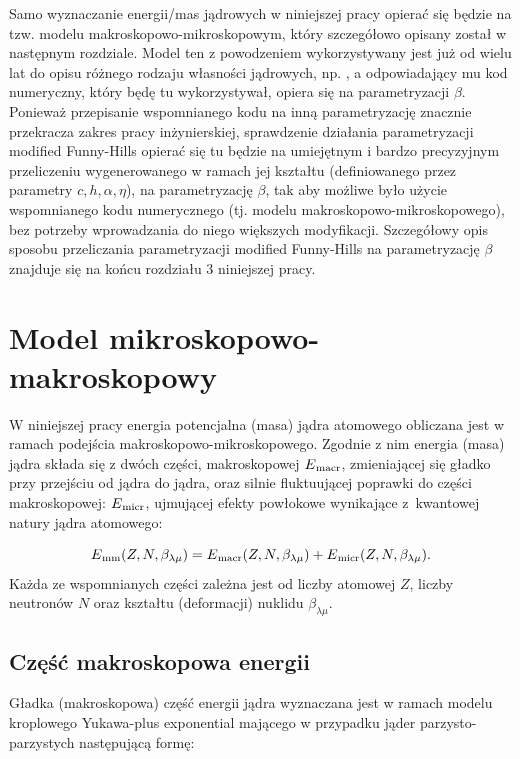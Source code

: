 \documentclass[a4paper,polish]{article}
\numberwithin{equation}{section}
\begin{document}
Samo wyznaczanie energii/mas jądrowych w niniejszej pracy opierać się będzie na tzw. modelu makroskopowo-mikroskopowym, który szczegółowo opisany został w następnym rozdziale. Model ten z powodzeniem wykorzystywany jest już od wielu lat do opisu różnego rodzaju własności jądrowych, np. \cite{JACHQ,JACHBF,Muntian}, a odpowiadający mu kod numeryczny, który będę tu wykorzystywał, opiera się na parametryzacji $\beta$. Ponieważ przepisanie wspomnianego kodu na inną parametryzację znacznie przekracza zakres pracy inżynierskiej, sprawdzenie działania parametryzacji modified Funny-Hills opierać się tu będzie na umiejętnym i bardzo precyzyjnym przeliczeniu wygenerowanego w ramach jej kształtu (definiowanego przez parametry $c, h, \alpha, \eta$),  na parametryzację $\beta$, tak aby możliwe było użycie wspomnianego kodu numerycznego (tj. modelu makroskopowo-mikroskopowego), bez potrzeby wprowadzania do niego większych modyfikacji. Szczegółowy opis sposobu przeliczania parametryzacji modified Funny-Hills na parametryzację $\beta$ znajduje się na końcu rozdziału 3 niniejszej pracy.

\section{Model mikroskopowo-makroskopowy}

W niniejszej pracy energia potencjalna (masa) jądra atomowego obliczana jest w ramach podejścia makroskopowo-mikroskopowego. Zgodnie z nim energia (masa) jądra składa się z dwóch części, makroskopowej $E\textsubscript{macr}$, zmieniającej się gładko przy przejściu od jądra do jądra, oraz silnie fluktuującej poprawki do części makroskopowej: $E\textsubscript{micr}$, ujmującej efekty powłokowe wynikające z~kwantowej natury jądra atomowego: 

\begin{equation}
E\textsubscript{mm}(Z,N,\beta_{\lambda \mu}) = E\textsubscript{macr}(Z,N,\beta_{\lambda \mu}) + E\textsubscript{micr}(Z,N,\beta_{\lambda \mu}).
\end{equation}
Każda ze wspomnianych części zależna jest od liczby atomowej $Z$, liczby neutronów $N$ oraz kształtu (deformacji) nuklidu $\beta_{\lambda \mu}$.

\subsection{Część makroskopowa energii}
Gładka (makroskopowa) część energii jądra wyznaczana jest w ramach modelu kroplowego Yukawa-plus exponential \cite{Krappe} mającego w przypadku jąder parzysto-parzystych następującą formę:
\end{document}
